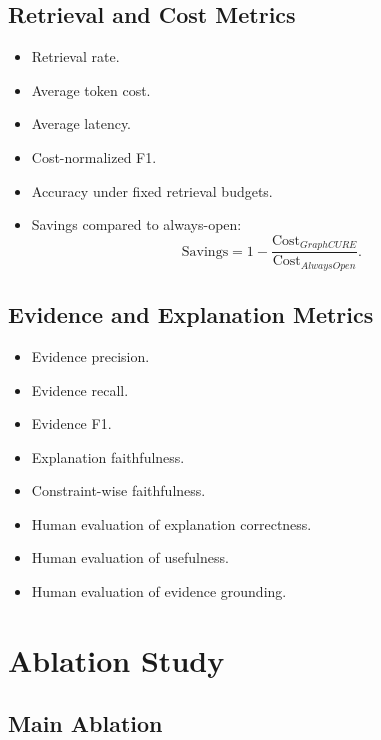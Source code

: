 \documentclass[11pt,a4paper]{article}
\begin{document}
\subsection{Retrieval and Cost Metrics}

\begin{itemize}[leftmargin=1.5em]
\item Retrieval rate.
\item Average token cost.
\item Average latency.
\item Cost-normalized F1.
\item Accuracy under fixed retrieval budgets.
\item Savings compared to always-open:
\[
\text{Savings}
=
1-
\frac{
\text{Cost}_{GraphCURE}
}{
\text{Cost}_{AlwaysOpen}
}.
\]
\end{itemize}

\subsection{Evidence and Explanation Metrics}

\begin{itemize}[leftmargin=1.5em]
\item Evidence precision.
\item Evidence recall.
\item Evidence F1.
\item Explanation faithfulness.
\item Constraint-wise faithfulness.
\item Human evaluation of explanation correctness.
\item Human evaluation of usefulness.
\item Human evaluation of evidence grounding.
\end{itemize}

\section{Ablation Study}

\subsection{Main Ablation}
\end{document}
